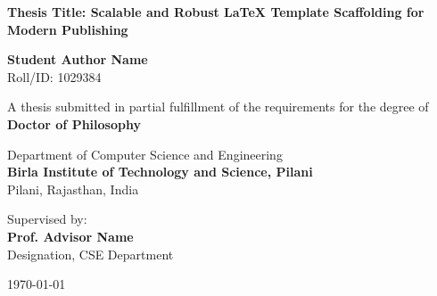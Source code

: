 \begin{titlepage}
\begin{center}
    \vspace*{1cm}
    
    
    \vspace{1.5cm}
    
    {\huge \bfseries \color{primary} Thesis Title: Scalable and Robust LaTeX Template Scaffolding for Modern Publishing}
    
    \vspace{1.5cm}
    
    {\Large \bfseries Student Author Name} \\
    \vspace{0.2cm}
    {Roll/ID: 1029384}
    
    \vspace{1.5cm}
    
    {A thesis submitted in partial fulfillment of the requirements for the degree of} \\
    \vspace{0.3cm}
    {\large \bfseries \color{secondary} Doctor of Philosophy}
    
    \vspace{1.5cm}
    
    {\large Department of Computer Science and Engineering} \\
    \vspace{0.2cm}
    {\large \bfseries \color{primary} Birla Institute of Technology and Science, Pilani} \\
    \vspace{0.1cm}
    {Pilani, Rajasthan, India}
    
    \vfill
    
    {Supervised by:} \\
    {\large \bfseries Prof. Advisor Name} \\
    {Designation, CSE Department}
    
    \vspace{1cm}
    
    {\large \today}
    
\end{center}
\end{titlepage}

